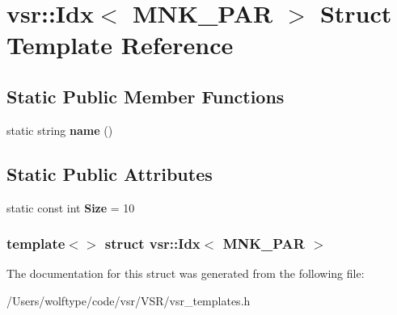 \hypertarget{structvsr_1_1_idx_3_01_m_n_k___p_a_r_01_4}{\section{vsr\-:\-:Idx$<$ M\-N\-K\-\_\-\-P\-A\-R $>$ Struct Template Reference}
\label{structvsr_1_1_idx_3_01_m_n_k___p_a_r_01_4}
}
\subsection*{Static Public Member Functions}
\begin{DoxyCompactItemize}
\item 
\hypertarget{structvsr_1_1_idx_3_01_m_n_k___p_a_r_01_4_aee798360e997c4da03f2591ca6c64cbb}{static string {\bfseries name} ()}\label{structvsr_1_1_idx_3_01_m_n_k___p_a_r_01_4_aee798360e997c4da03f2591ca6c64cbb}

\end{DoxyCompactItemize}
\subsection*{Static Public Attributes}
\begin{DoxyCompactItemize}
\item 
\hypertarget{structvsr_1_1_idx_3_01_m_n_k___p_a_r_01_4_a979bae137819d340899e9cd0b99a58ca}{static const int {\bfseries Size} = 10}\label{structvsr_1_1_idx_3_01_m_n_k___p_a_r_01_4_a979bae137819d340899e9cd0b99a58ca}

\end{DoxyCompactItemize}
\subsubsection*{template$<$$>$ struct vsr\-::\-Idx$<$ M\-N\-K\-\_\-\-P\-A\-R $>$}



The documentation for this struct was generated from the following file\-:\begin{DoxyCompactItemize}
\item 
/\-Users/wolftype/code/vsr/\-V\-S\-R/vsr\-\_\-templates.\-h\end{DoxyCompactItemize}
